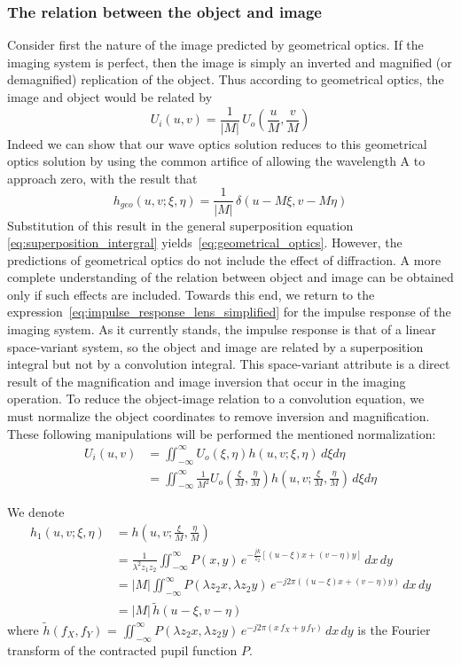 \documentclass{article}
\begin{document}
\subsubsection{The relation between the object and image}
Consider first the nature of the image predicted by geometrical optics. If the imaging
system is perfect, then the image is simply an inverted and magnified (or demagnified)
replication of the object. Thus according to geometrical optics, the image and object
would be related by
\begin{equation}\label{eq:geometrical_optics}
    U_i(u,v) = \frac{1}{|M|} \, U_o\left(\frac{u}{M}, \frac{v}{M}\right)
\end{equation}
Indeed we can show that our wave optics solution reduces to this geometrical optics
solution by using the common artifice of allowing the wavelength A to approach zero,
with the result that
\begin{equation}
    h_{geo}(u,v; \xi, \eta) = \frac{1}{|M|} \, \delta(u - M\xi, v - M\eta)
\end{equation}
Substitution of this result in the general superposition equation \ref{eq:superposition_intergral} yields~\cref{eq:geometrical_optics}.
However, the predictions of geometrical optics do not include the effect of diffraction.
A more complete understanding of the relation between object and image can be obtained
only if such effects are included.
Towards this end, we return to the expression~\cref{eq:impulse_response_lens_simplified} for the impulse response of the imaging system.
As it currently stands, the impulse response is that of a linear space-variant system, so the object and image are related by a superposition integral but not by a convolution integral.
This space-variant attribute is a direct result of the magnification and image inversion that occur in the imaging operation. 
To reduce the object-image relation to a convolution equation, we must normalize the object coordinates to remove inversion and magnification.
These following manipulations will be performed the mentioned normalization:
\begin{align}
    U_i(u,v) &= \iint_{-\infty}^{\infty} U_o(\xi, \eta) h(u,v; \xi, \eta) \,d\xi d\eta \\
    &= \iint_{-\infty}^{\infty} \frac{1}{M^2} U_o(\frac{\xi}{M}, \frac{\eta}{M}) h(u,v; \frac{\xi}{M}, \frac{\eta}{M}) \,d\xi d\eta 
\end{align}


We denote
\begin{align}
    h_1(u,v; \xi, \eta) &= h(u,v; \frac{\xi}{M}, \frac{\eta}{M}) \\
    &= \frac{1}{\lambda^2 z_1 z_2} \iint_{-\infty}^{\infty} P(x,y) \, e^{-\frac{j k}{z_2} \left[(u-\xi)x + (v-\eta)y \right]} \, dx \, dy\\
    &= |M| \iint_{-\infty}^{\infty} P(\lambda z_2 x, \lambda z_2 y) \, e^{-j 2\pi \left((u-\xi)x + (v-\eta)y \right)} \, dx \, dy \\
    &= |M| \, \tilde{h}(u-\xi, v-\eta)
\end{align}
where $\tilde{h}(f_X,f_Y)$ = $\iint_{-\infty}^{\infty} P(\lambda z_2 x, \lambda z_2 y) \, e^{-j 2\pi \left(x \, f_X + y \, f_Y \right)} \, dx \, dy$  is the Fourier transform of the contracted pupil function $P$.
\end{document}
